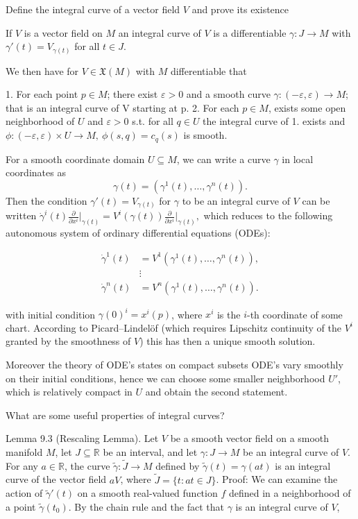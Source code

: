 Define the integral curve of a vector field \( V \)
and prove its existence

If \( V \) is a vector field on \( M \) an integral curve of \( V \)
is a differentiable \( \gamma : J \to M \) with \( \gamma'(t) = V_{\gamma(t)} \)
for all \( t \in J \).

We then have for \( V \in \mathfrak{X}(M) \) with \( M \) differentiable
that

1. For each point \( p \in M \); there exist \( \varepsilon > 0 \) and a smooth curve \( \gamma : (-\varepsilon, \varepsilon) \to M \); 
that is an integral curve of V starting at p.
2. For each \( p \in M \), exists some open neighborhood of \( U \) and \( \varepsilon > 0 \)
s.t. for all \(q \in U\) the integral curve of 1. exists and 
\( \phi : (-\varepsilon, \varepsilon) \times U \to M, \ \phi(s,q) = c_q(s) \) 
is smooth.

For a smooth coordinate domain \(U \subseteq M\), we can write a curve \(\gamma\) in local coordinates as
\[\gamma(t) = (\gamma^1(t), \dots, \gamma^n(t)).\] 
Then the condition \(\gamma'(t) = V_{\gamma(t)}\) for \(\gamma\) to be an integral curve of \(V\) can be written
\(\dot{\gamma}^i(t) \frac{\partial}{\partial x^i} \bigg|_{\gamma(t)} = V^i(\gamma(t)) \frac{\partial}{\partial x^i} \bigg|_{\gamma(t)},\)
which reduces to the following autonomous system of ordinary differential equations (ODEs):

\begin{align*}
\dot{\gamma}^1(t) &= V^1(\gamma^1(t), \dots, \gamma^n(t)), \\
&\vdots \\
\dot{\gamma}^n(t) &= V^n(\gamma^1(t), \dots, \gamma^n(t)). \tag{9.1}
\end{align*}

with initial condition \( \gamma(0)^i = x^i(p) \), where \( x^i \) is the \( i \)-th coordinate of some chart.
According to Picard–Lindelöf (which requires Lipschitz continuity of the \( V^i \) granted by the smoothness of \( V \))
this has then a unique smooth solution.

Moreover the theory of ODE's states on compact subsets ODE's vary smoothly on their initial conditions, hence
we can choose some smaller neighborhood \( U' \), which is relatively compact in \( U \) and obtain the second statement.


What are some useful properties of integral curves?

Lemma 9.3 (Rescaling Lemma). 
Let \(V\) be a smooth vector field on a smooth manifold \(M\), let \(J \subseteq \mathbb{R}\) be an interval, 
and let \(\gamma: J \to M\) be an integral curve of \(V\). 
For any \(a \in \mathbb{R}\), the curve \(\tilde{\gamma}: \tilde{J} \to M\) defined by \(\tilde{\gamma}(t) = \gamma(at)\) 
is an integral curve of the vector field \(aV\), where \(\tilde{J} = \{t: at \in J\}\).
Proof:
We can examine the action of \(\tilde{\gamma}'(t)\)
on a smooth real-valued function \(f\) defined in a neighborhood of a point \(\tilde{\gamma}(t_0)\). By
the chain rule and the fact that \(\gamma\) is an integral curve of \(V\),

